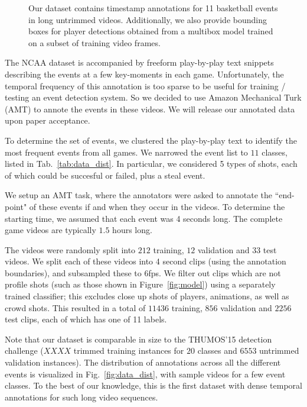 \begin{figure}

  \caption{Our dataset contains timestamp annotations for 11 basketball events
    in long untrimmed videos. Additionally, we also provide bounding boxes for player
    detections obtained from a multibox model trained on a subset of training
  video frames.}
\end{figure}

The NCAA dataset is accompanied by freeform play-by-play text snippets
describing the events at a few key-moments in each game.  Unfortunately, the
temporal frequency of this annotation is too sparse to be useful for training /
testing an event detection system.  So we decided to use Amazon Mechanical Turk
(AMT) to annote the events in these videos. We will release our annotated data
upon paper acceptance.

To determine the set of events, we clustered the play-by-play text to identify
the most frequent events from all games. We narrowed the event list to $11$
classes, listed in Tab.~\ref{tab:data_dist}.  In particular, we considered
5 types of shots, each of which could be succesful or failed, plus a steal
event. 

We setup an AMT task, where the annotators were asked to annotate the
``end-point" of these events if and when they occur in the videos.  To
determine the starting time, we assumed that each event was 4 seconds long.
The complete game videos are typically $1.5$ hours long.

The videos were randomly split into $212$ training, $12$ validation and $33$
test videos.  We split each of these videos into 4 second clips (using the
annotation boundaries), and subsampled these to 6fps.  We filter out clips
which are not profile shots (such as those shown in Figure~\ref{fig:model})
using a separately trained classifier; this excludes close up shots of players,
animations, as well as crowd shots.  This resulted in a total of $11436$
training, $856$ validation and $2256$ test clips, each of which has one of 11
labels.

Note that our dataset is comparable in size to the THUMOS'15 detection
challenge ($XXXX$ trimmed training instances for $20$ classes and $6553$
untrimmed validation instances). The distribution of annotations across all the
different events is visualized in Fig.~\ref{fig:data_dist}, with sample videos
for a few event classes. To the best of our
knowledge, this is the first dataset with dense temporal annotations for
such long video sequences.
